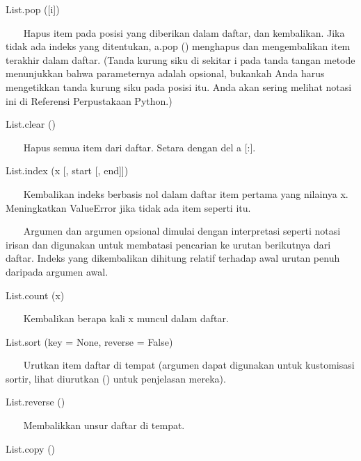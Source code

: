 List.pop ([i]) \par
\vspace{12pt}
~~~ Hapus item pada posisi yang diberikan dalam daftar, dan kembalikan. Jika tidak ada indeks yang ditentukan, a.pop () menghapus dan mengembalikan item terakhir dalam daftar. (Tanda kurung siku di sekitar i pada tanda tangan metode menunjukkan bahwa parameternya adalah opsional, bukankah Anda harus mengetikkan tanda kurung siku pada posisi itu. Anda akan sering melihat notasi ini di Referensi Perpustakaan Python.) \par
\vspace{12pt}
List.clear () \par
\vspace{12pt}
~~~ Hapus semua item dari daftar. Setara dengan del a [:]. \par
\vspace{12pt}
List.index (x [, start [, end]]) \par
\vspace{12pt}
~~~ Kembalikan indeks berbasis nol dalam daftar item pertama yang nilainya x. Meningkatkan ValueError jika tidak ada item seperti itu. \par
\vspace{12pt}
~~~ Argumen dan argumen opsional dimulai dengan interpretasi seperti notasi irisan dan digunakan untuk membatasi pencarian ke urutan berikutnya dari daftar. Indeks yang dikembalikan dihitung relatif terhadap awal urutan penuh daripada argumen awal. \par
\vspace{12pt}
List.count (x) \par
\vspace{12pt}
~~~ Kembalikan berapa kali x muncul dalam daftar. \par
\vspace{12pt}
List.sort (key = None, reverse = False) \par
\vspace{12pt}
~~~ Urutkan item daftar di tempat (argumen dapat digunakan untuk kustomisasi sortir, lihat diurutkan () untuk penjelasan mereka). \par
\vspace{12pt}
List.reverse () \par
\vspace{12pt}
~~~ Membalikkan unsur daftar di tempat. \par
\vspace{12pt}
List.copy () \par
\vspace{12pt}
